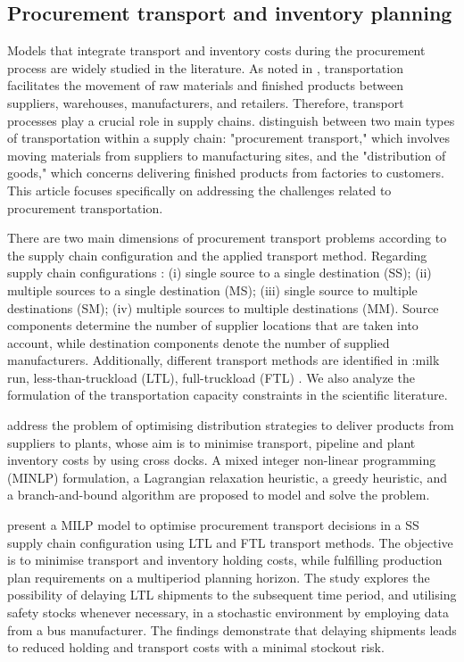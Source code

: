 \subsection{Procurement transport and inventory planning}

Models that integrate transport and inventory costs during the procurement process are widely studied in the literature. As noted in \autocite{Langley2020SupplyPerspective}, transportation facilitates the movement of raw materials and finished products between suppliers,  warehouses, manufacturers, and retailers. Therefore, transport processes play a crucial role in supply chains. \autocite{Fleischmann2015TransportDistribution} distinguish between two main types of transportation within a supply chain: "procurement transport," which involves moving materials from suppliers to manufacturing sites, and the "distribution of goods," which concerns delivering finished products from factories to customers. This article focuses specifically on addressing the challenges related to procurement transportation.

There are two main dimensions of procurement transport problems according to the supply chain configuration and the applied transport method. Regarding supply chain configurations \autocite{Mosca2019IntegratedReview}: (i) single source to a single destination (SS); (ii) multiple sources to a single destination (MS);
(iii) single source to multiple destinations (SM); (iv) multiple sources to multiple destinations (MM). Source components determine the number of supplier locations that are taken into account, while destination components denote the number of supplied manufacturers. Additionally, different transport methods are identified in \autocite{Diaz-Madronero2014AChain}:milk run, less-than-truckload (LTL),  full-truckload (FTL) . We also analyze the formulation of the transportation capacity constraints in the scientific literature.

\autocite{Berman2006InboundCost} address the problem of optimising distribution strategies to deliver products from suppliers to plants, whose aim is to minimise transport, pipeline and plant inventory costs by using cross docks. A mixed integer non-linear programming (MINLP) formulation, a Lagrangian  relaxation heuristic,  a greedy heuristic, and a branch-and-bound algorithm are proposed to model and solve the problem.

\autocite{Sancak2011Multi-itemPolicy} present a MILP model to optimise procurement transport decisions in a SS supply chain configuration using LTL and FTL transport methods. The objective is to minimise transport and inventory holding costs, while fulfilling production plan requirements on a multiperiod planning horizon. The study explores the possibility of delaying LTL shipments to the subsequent time period, and utilising safety stocks whenever necessary, in a stochastic environment by employing data from a bus manufacturer. The findings demonstrate that delaying shipments leads to reduced holding and transport costs with a minimal stockout risk.


